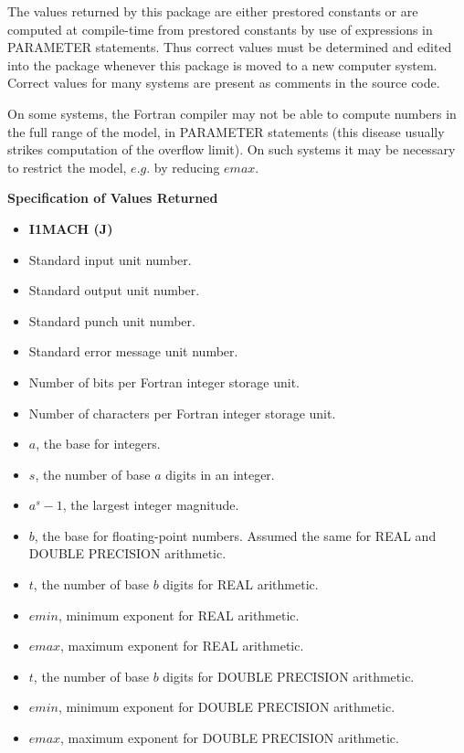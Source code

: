 \documentclass[twoside]{MATH77}
\begin{document}
The values returned by this package are either prestored constants or are
computed at compile-time from prestored constants by use of expressions in
PARAMETER statements. Thus correct values must be determined and edited into
the package whenever this package is moved to a new computer system. Correct
values for many systems are present as comments in the source code.

On some systems, the Fortran compiler may not be able to compute
numbers in the full range of the model, in PARAMETER statements (this
disease usually strikes computation of the overflow limit).  On such
systems it may be necessary to restrict the model, $e.g.$ by reducing
$emax$.

{\bf Specification of Values Returned}
\begin{itemize}
\item[\bf J]  {\hspace{.5in} {\bf I1MACH (J)}}
\item[1]  Standard input unit number.
\item[2]  Standard output unit number.
\item[3]  Standard punch unit number.
\item[4]  Standard error message unit number.
\item[5]  Number of bits per Fortran integer storage unit.
\item[6]  Number of characters per Fortran integer storage unit.
\item[7]  $a$, the base for integers.
\item[8]  $s$, the number of base $a$ digits in an integer.
\item[9]  $a^s-1$, the largest integer magnitude.
\item[10]  $b$, the base for floating-point numbers. Assumed the same for
REAL and DOUBLE PRECISION arithmetic.
\item[11]  $t$, the number of base $b$ digits for REAL arithmetic.
\item[12]  $emin$, minimum exponent for REAL arithmetic.
\item[13]  $emax$, maximum exponent for REAL arithmetic.
\item[14]  $t$, the number of base $b$ digits for DOUBLE PRECISION
arithmetic.
\item[15]  $emin$, minimum exponent for DOUBLE PRECISION arithmetic.
\item[16]  $emax$, maximum exponent for DOUBLE PRECISION arithmetic.
\end{itemize}
\end{document}

